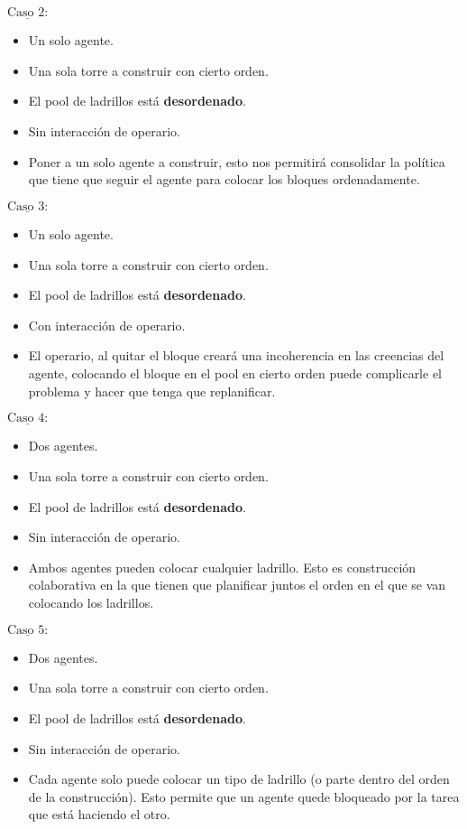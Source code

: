 \documentclass[12pt]{report}
\newcommand{\textunderline}[1]{$\underline{\mbox{#1}}$} %
\begin{document}
  \textunderline{Caso 2:}
    \begin{itemize}
      \item Un solo agente.
      \item Una sola torre a construir con cierto orden.
      \item El pool de ladrillos est\'a \textbf{desordenado}.
      \item Sin interacci\'on de operario.
      \item Poner a un solo agente a construir, esto nos permitir\'a consolidar la pol\'itica que tiene que seguir el agente para colocar los bloques ordenadamente.
    \end{itemize}

  \textunderline{Caso 3:}
    \begin{itemize}
      \item Un solo agente.
      \item Una sola torre a construir con cierto orden.
      \item El pool de ladrillos est\'a \textbf{desordenado}.
      \item Con interacci\'on de operario.
      \item El operario, al quitar el bloque crear\'a una incoherencia en las creencias del agente, colocando el bloque en el pool en cierto orden puede complicarle el problema y hacer que tenga que replanificar.
    \end{itemize}

  \textunderline{Caso 4:}
    \begin{itemize}
      \item Dos agentes.
      \item Una sola torre a construir con cierto orden.
      \item El pool de ladrillos est\'a \textbf{desordenado}.
      \item Sin interacci\'on de operario.
      \item Ambos agentes pueden colocar cualquier ladrillo. Esto es construcci\'on colaborativa en la que tienen que planificar juntos el orden en el que se van colocando los ladrillos.
    \end{itemize}

  \textunderline{Caso 5:}
    \begin{itemize}
      \item Dos agentes.
      \item Una sola torre a construir con cierto orden.
      \item El pool de ladrillos est\'a \textbf{desordenado}.
      \item Sin interacci\'on de operario.
      \item Cada agente solo puede colocar un tipo de ladrillo (o parte dentro del orden de la construcci\'on). Esto permite que un agente quede bloqueado por la tarea que est\'a haciendo el otro.
    \end{itemize}
\end{document}
